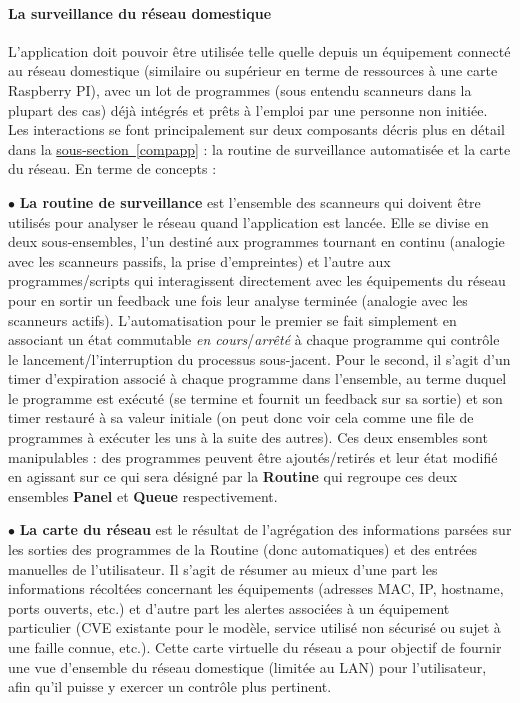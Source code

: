 \documentclass[]{article}
\newcommand{\wordlink}[2]{\hyperref[#1]{#2~\ref{#1}}}
\begin{document}
\paragraph{La surveillance du réseau domestique}

L'application doit pouvoir être utilisée telle quelle depuis un équipement connecté au réseau domestique (similaire ou supérieur en terme de ressources à une carte Raspberry PI), avec un lot de programmes (sous entendu scanneurs dans la plupart des cas) déjà intégrés et prêts à l'emploi par une personne non initiée.
Les interactions se font principalement sur deux composants décris plus en détail dans la \wordlink{compapp}{sous-section} : la routine de surveillance automatisée et la carte du réseau. En terme de concepts :\\

\par $\bullet$ \textbf{La routine de surveillance} est l'ensemble des scanneurs qui doivent être utilisés pour analyser le réseau quand l'application est lancée. Elle se divise en deux sous-ensembles, l'un destiné aux programmes tournant en continu (analogie avec les scanneurs passifs, la prise d'empreintes) et l'autre aux programmes/scripts qui interagissent directement avec les équipements du réseau pour en sortir un feedback une fois leur analyse terminée (analogie avec les scanneurs actifs). L'automatisation pour le premier se fait simplement en associant un état commutable \textit{en cours}/\textit{arrêté} à chaque programme qui contrôle le lancement/l'interruption du processus sous-jacent. Pour le second, il s'agit d'un timer d'expiration associé à chaque programme dans l'ensemble, au terme duquel le programme est exécuté (se termine et fournit un feedback sur sa sortie) et son timer restauré à sa valeur initiale (on peut donc voir cela comme une file de programmes à exécuter les uns à la suite des autres). Ces deux ensembles sont manipulables : des programmes peuvent être ajoutés/retirés et leur état modifié en agissant sur ce qui sera désigné par la \textbf{Routine} qui regroupe ces deux ensembles \textbf{Panel} et \textbf{Queue} respectivement.

\newpage

\par $\bullet$ \textbf{La carte du réseau} est le résultat de l'agrégation des informations parsées sur les sorties des programmes de la Routine (donc automatiques) et des entrées manuelles de l'utilisateur. Il s'agit de résumer au mieux d'une part les informations récoltées concernant les équipements (adresses MAC, IP, hostname, ports ouverts, etc.) et d'autre part les alertes associées à un équipement particulier (CVE existante pour le modèle, service utilisé non sécurisé ou sujet à une faille connue, etc.). Cette carte virtuelle du réseau a pour objectif de fournir une vue d'ensemble du réseau domestique (limitée au LAN) pour l'utilisateur, afin qu'il puisse y exercer un contrôle plus pertinent.
\end{document}

